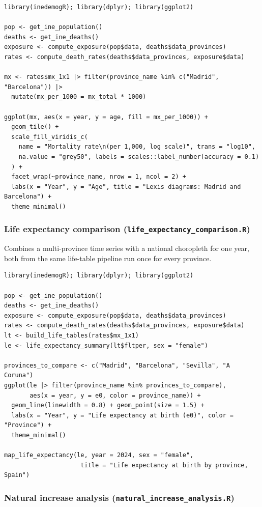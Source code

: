 \documentclass[11pt]{article}
\newcommand{\fn}[1]{\texttt{#1}}
\begin{document}
\begin{lstlisting}
library(inedemogR); library(dplyr); library(ggplot2)

pop <- get_ine_population()
deaths <- get_ine_deaths()
exposure <- compute_exposure(pop$data, deaths$data_provinces)
rates <- compute_death_rates(deaths$data_provinces, exposure$data)

mx <- rates$mx_1x1 |> filter(province_name %in% c("Madrid", "Barcelona")) |>
  mutate(mx_per_1000 = mx_total * 1000)

ggplot(mx, aes(x = year, y = age, fill = mx_per_1000)) +
  geom_tile() +
  scale_fill_viridis_c(
    name = "Mortality rate\n(per 1,000, log scale)", trans = "log10",
    na.value = "grey50", labels = scales::label_number(accuracy = 0.1)
  ) +
  facet_wrap(~province_name, nrow = 1, ncol = 2) +
  labs(x = "Year", y = "Age", title = "Lexis diagrams: Madrid and Barcelona") +
  theme_minimal()
\end{lstlisting}

\subsubsection{Life expectancy comparison (\fn{life\_expectancy\_comparison.R})}

Combines a multi-province time series with a national choropleth for one
year, both from the same life-table pipeline run once for every province.

\begin{lstlisting}
library(inedemogR); library(dplyr); library(ggplot2)

pop <- get_ine_population()
deaths <- get_ine_deaths()
exposure <- compute_exposure(pop$data, deaths$data_provinces)
rates <- compute_death_rates(deaths$data_provinces, exposure$data)
lt <- build_life_tables(rates$mx_1x1)
le <- life_expectancy_summary(lt$fltper, sex = "female")

provinces_to_compare <- c("Madrid", "Barcelona", "Sevilla", "A Coruna")
ggplot(le |> filter(province_name %in% provinces_to_compare),
       aes(x = year, y = e0, color = province_name)) +
  geom_line(linewidth = 0.8) + geom_point(size = 1.5) +
  labs(x = "Year", y = "Life expectancy at birth (e0)", color = "Province") +
  theme_minimal()

map_life_expectancy(le, year = 2024, sex = "female",
                     title = "Life expectancy at birth by province, Spain")
\end{lstlisting}

\subsubsection{Natural increase analysis (\fn{natural\_increase\_analysis.R})}
\end{document}

